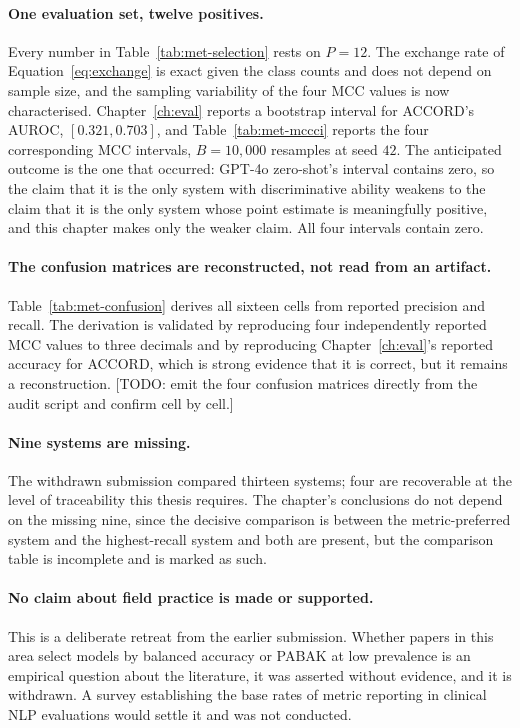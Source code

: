 \paragraph{One evaluation set, twelve positives.} Every number in
Table~\ref{tab:met-selection} rests on $P = 12$. The exchange rate of
Equation~\eqref{eq:exchange} is exact given the class counts and does not
depend on sample size, and the sampling variability of the four MCC values is now
characterised. Chapter~\ref{ch:eval} reports a bootstrap interval for ACCORD's
AUROC, $[0.321, 0.703]$, and Table~\ref{tab:met-mccci} reports the four
corresponding MCC intervals, $B = 10{,}000$ resamples at seed $42$. The
anticipated outcome is the one that occurred: GPT-4o zero-shot's interval
contains zero, so the claim that it is the only system with discriminative
ability weakens to the claim that it is the only system whose point estimate is
meaningfully positive, and this chapter makes only the weaker claim. All four
intervals contain zero.

\paragraph{The confusion matrices are reconstructed, not read from an artifact.}
Table~\ref{tab:met-confusion} derives all sixteen cells from reported precision
and recall. The derivation is validated by reproducing four independently
reported MCC values to three decimals and by reproducing Chapter~\ref{ch:eval}'s
reported accuracy for ACCORD, which is strong evidence that it is correct, but
it remains a reconstruction. [TODO: emit the four confusion matrices directly
from the audit script and confirm cell by cell.]

\paragraph{Nine systems are missing.} The withdrawn submission compared thirteen
systems; four are recoverable at the level of traceability this thesis requires.
The chapter's conclusions do not depend on the missing nine, since the decisive
comparison is between the metric-preferred system and the highest-recall system
and both are present, but the comparison table is incomplete and is marked as
such.

\paragraph{No claim about field practice is made or supported.} This is a
deliberate retreat from the earlier submission. Whether papers in this area
select models by balanced accuracy or PABAK at low prevalence is an empirical
question about the literature, it was asserted without evidence, and it is
withdrawn. A survey establishing the base rates of metric reporting in clinical
NLP evaluations would settle it and was not conducted.

